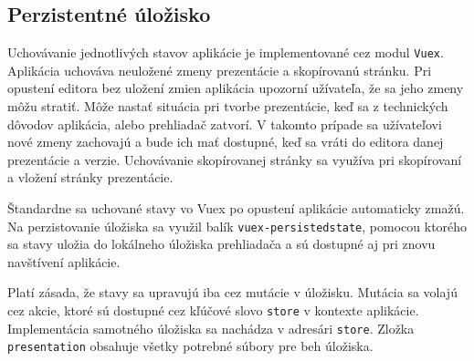 \vspace{5mm}
\vspace{5mm}

\subsection{Perzistentné úložisko}
\label{persistedstore}
Uchovávanie jednotlivých stavov aplikácie je implementované cez modul \texttt{Vuex}. Aplikácia uchováva neuložené zmeny prezentácie a skopírovanú stránku. Pri opustení editora bez uložení zmien aplikácia upozorní užívateľa, že sa jeho zmeny môžu stratiť. Môže nastať situácia pri tvorbe prezentácie, keď sa z technických dôvodov aplikácia, alebo prehliadač zatvorí. V takomto prípade sa užívateľovi nové zmeny zachovajú a bude ich mať dostupné, keď sa vráti do editora danej prezentácie a verzie. Uchovávanie skopírovanej stránky sa využíva pri skopírovaní a vložení stránky prezentácie. 

Štandardne sa uchované stavy vo Vuex po opustení aplikácie automaticky zmažú. Na perzistovanie úložiska sa využil balík \texttt{vuex-persistedstate}, pomocou ktorého sa stavy uložia do lokálneho úložiska prehliadača a sú dostupné aj pri znovu navštívení aplikácie.

Platí zásada, že stavy sa upravujú iba cez mutácie v úložisku. Mutácia sa volajú cez akcie, ktoré sú dostupné cez kľúčové slovo \texttt{store} v kontexte aplikácie. Implementácia samotného úložiska sa nachádza v adresári \texttt{store}. Zložka \texttt{presentation} obsahuje všetky potrebné súbory pre beh úložiska.

